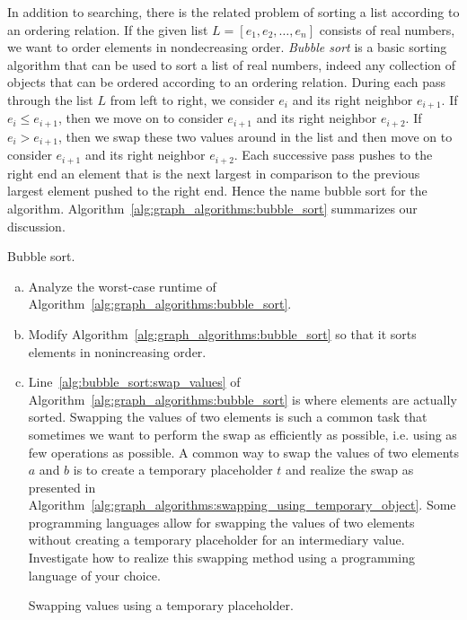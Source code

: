 \begin{problem}
\item In addition to searching, there is the related problem of
  sorting a list according to an ordering relation. If the given list
  $L = [e_1, e_2, \dots, e_n]$ consists of real numbers, we want to
  order elements in nondecreasing order. \emph{Bubble sort} is a basic
  sorting algorithm that can be used to sort a list of real numbers,
  indeed any collection of objects that can be ordered according to an
  ordering relation. During each pass through the list $L$ from left
  to right, we consider $e_i$ and its right neighbor $e_{i+1}$. If
  $e_i \leq e_{i+1}$, then we move on to consider $e_{i+1}$ and its
  right neighbor $e_{i+2}$. If $e_i > e_{i+1}$, then we swap these two
  values around in the list and then move on to consider $e_{i+1}$ and
  its right neighbor $e_{i+2}$. Each successive pass pushes to the
  right end an element that is the next largest in comparison to the
  previous largest element pushed to the right end. Hence the name
  bubble sort for the
  algorithm. Algorithm~\ref{alg:graph_algorithms:bubble_sort}
  summarizes our discussion.
  \begin{algorithm}[!htbp]
    
    \caption{Bubble sort.}
    \label{alg:graph_algorithms:bubble_sort}
  \end{algorithm}
  \begin{enumerate}[(a)]
  \item Analyze the worst-case runtime of
    Algorithm~\ref{alg:graph_algorithms:bubble_sort}.

  \item Modify Algorithm~\ref{alg:graph_algorithms:bubble_sort} so
    that it sorts elements in nonincreasing order.

  \item Line~\ref{alg:bubble_sort:swap_values} of
    Algorithm~\ref{alg:graph_algorithms:bubble_sort} is where elements
    are actually sorted. Swapping the values of two elements is such a
    common task that sometimes we want to perform the swap as
    efficiently as possible, i.e. using as few operations as
    possible. A common way to swap the values of two elements $a$ and
    $b$ is to create a temporary placeholder $t$ and realize the swap
    as presented in
    Algorithm~\ref{alg:graph_algorithms:swapping_using_temporary_object}.
    Some programming languages allow for swapping the values of two
    elements without creating a temporary placeholder for an
    intermediary value. Investigate how to realize this swapping
    method using a programming language of your choice.
    \begin{algorithm}[!htbp]
      
      \caption{Swapping values using a temporary placeholder.}
      \label{alg:graph_algorithms:swapping_using_temporary_object}
    \end{algorithm}
  \end{enumerate}


\end{problem}
